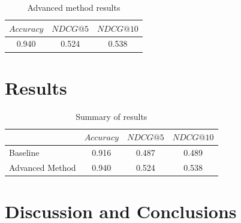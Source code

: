 \documentclass[sigconf]{acmart}
\begin{document}
\begin{table}[h]
    \centering
    \caption{Advanced method results}
    \begin{tabular}{c|c|c}
    $Accuracy$ & $NDCG@5$ & $NDCG@10$ \\
    \hline
    0.940 & 0.524 & 0.538
    \end{tabular}
    \label{tab:baseline_res}
\end{table}


\section{Results}


\begin{table}[h]
\begin{center}
\caption{Summary of results}
\begin{tabular}{l|c|c|c}
     & $Accuracy$ & $NDCG@5$ & $NDCG@10$ \\
    \hline
    Baseline & 0.916 &  0.487 & 0.489 \\
    Advanced Method & 0.940 & 0.524 &  0.538 \\
\end{tabular}
\label{table:1}
\end{center}
\end{table}



\section{Discussion and Conclusions}








\end{document}
